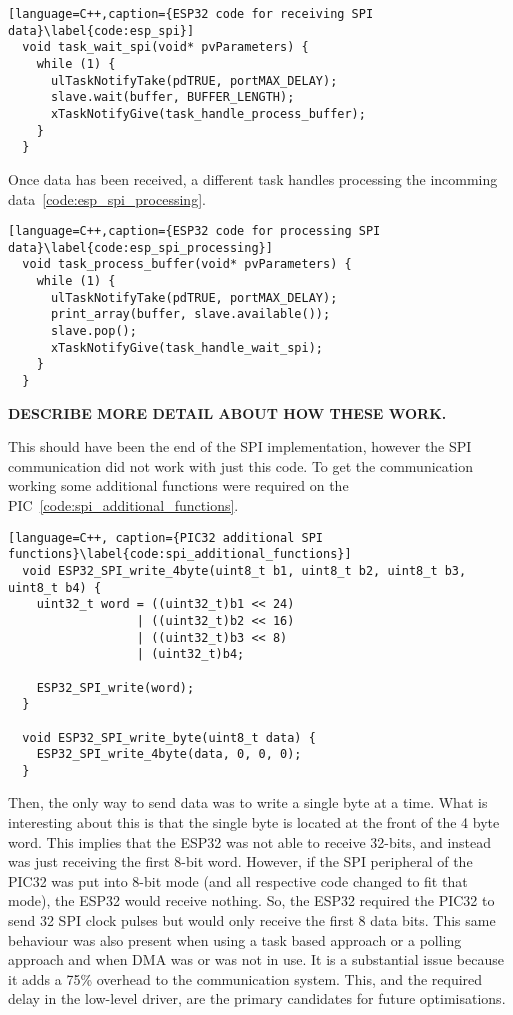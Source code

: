 \begin{lstlisting}[language=C++,caption={ESP32 code for receiving SPI data}\label{code:esp_spi}]
  void task_wait_spi(void* pvParameters) {
    while (1) {
      ulTaskNotifyTake(pdTRUE, portMAX_DELAY);
      slave.wait(buffer, BUFFER_LENGTH);
      xTaskNotifyGive(task_handle_process_buffer);
    }
  }
\end{lstlisting}

Once data has been received, a different task handles processing the incomming data~\autoref{code:esp_spi_processing}.

\begin{lstlisting}[language=C++,caption={ESP32 code for processing SPI data}\label{code:esp_spi_processing}]
  void task_process_buffer(void* pvParameters) {
    while (1) {
      ulTaskNotifyTake(pdTRUE, portMAX_DELAY);
      print_array(buffer, slave.available());
      slave.pop();
      xTaskNotifyGive(task_handle_wait_spi);
    }
  }
\end{lstlisting}

\textbf{DESCRIBE MORE DETAIL ABOUT HOW THESE WORK.}

This should have been the end of the SPI implementation,
however the SPI communication did not work with just this code.
To get the communication working some additional functions were required on the PIC~\autoref{code:spi_additional_functions}.

\begin{lstlisting}[language=C++, caption={PIC32 additional SPI functions}\label{code:spi_additional_functions}]
  void ESP32_SPI_write_4byte(uint8_t b1, uint8_t b2, uint8_t b3, uint8_t b4) {
    uint32_t word = ((uint32_t)b1 << 24)
                  | ((uint32_t)b2 << 16)
                  | ((uint32_t)b3 << 8)
                  | (uint32_t)b4;

    ESP32_SPI_write(word);
  }

  void ESP32_SPI_write_byte(uint8_t data) {
    ESP32_SPI_write_4byte(data, 0, 0, 0);
  }
\end{lstlisting}

Then, the only way to send data was to write a single byte at a time.
What is interesting about this is that the single byte is located at the front of the 4 byte word.
This implies that the ESP32 was not able to receive 32-bits, and instead was just receiving the first 8-bit word.
However, if the SPI peripheral of the PIC32 was put into 8-bit mode (and all respective code changed to fit that mode),
the ESP32 would receive nothing.
So, the ESP32 required the PIC32 to send 32 SPI clock pulses but would only receive the first 8 data bits.
This same behaviour was also present when using a task based approach or a polling approach and when DMA was or was not in use.
It is a substantial issue because it adds a 75\% overhead to the communication system.
This, and the required delay in the low-level driver, are the primary candidates for future optimisations.

